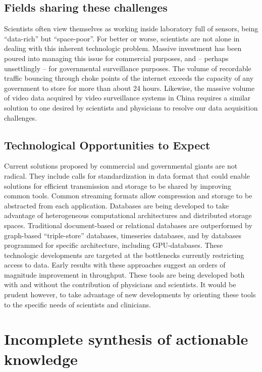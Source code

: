 \subsection{Fields sharing these challenges}
\label{sec:fields-sharing-this-challenges}

Scientists often view themselves as working inside laboratory full of sensors, being “data-rich” but “space-poor”.
For better or worse, scientists are not alone in dealing with this inherent technologic problem.
Massive investment has been poured into managing this issue for commercial purposes, and – perhaps unsettlingly – for governmental surveillance purposes.
The volume of recordable traffic bouncing through choke points of the internet exceeds the capacity of any government to store for more than about 24 hours.
Likewise, the massive volume of video data acquired by video surveillance systems in China requires a similar solution to one desired by scientists and physicians to resolve our data acquisition challenges.

\subsection{Technological Opportunities to Expect}
\label{sec:technological-opportunities-to-expect}

Current solutions proposed by commercial and governmental giants are not radical.
They include calls for standardization in data format that could enable solutions for efficient transmission and storage to be shared by improving common tools.
Common streaming formats allow compression and storage to be abstracted from each application.
Databases are being developed to take advantage of heterogeneous computational architectures and distributed storage spaces.
Traditional document-based or relational databases are outperformed by graph-based “triple-store” databases, timeseries databases, and by databases programmed for specific architecture, including GPU-databases.
These technologic developments are targeted at the bottlenecks currently restricting access to data.
Early results with these approaches suggest an orders of magnitude improvement in throughput.
These tools are being developed both with and without the contribution of physicians and scientists.
It would be prudent however, to take advantage of new developments by orienting these tools to the specific needs of scientists and clinicians.


\section{Incomplete synthesis of actionable knowledge}\label{incomplete-synthesis-of-actionable-knowledge}

